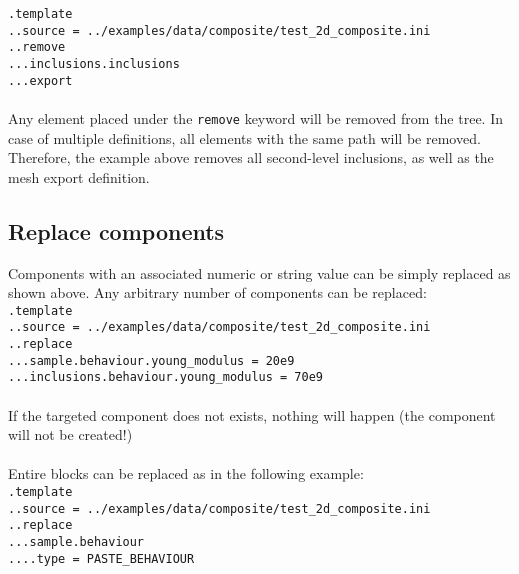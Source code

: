 \documentclass[10pt]{article}
\begin{document}
\noindent \verb+.template+\\
\verb+..source = ../examples/data/composite/test_2d_composite.ini+\\
\verb+..remove+\\
\verb+...inclusions.inclusions+\\
\verb+...export+

\paragraph{} Any element placed under the \verb+remove+ keyword will be removed from the tree. In case of multiple definitions, all elements with the same path will be removed. Therefore, the example above removes all second-level inclusions, as well as the mesh export definition.

\subsection{Replace components}

Components with an associated numeric or string value can be simply replaced as shown above. Any arbitrary number of components can be replaced:\\

\noindent \verb+.template+\\
\verb+..source = ../examples/data/composite/test_2d_composite.ini+\\
\verb+..replace+\\
\verb+...sample.behaviour.young_modulus = 20e9+\\
\verb+...inclusions.behaviour.young_modulus = 70e9+

\paragraph{} If the targeted component does not exists, nothing will happen (the component will not be created!)

\paragraph{} Entire blocks can be replaced as in the following example:\\

\noindent \verb+.template+\\
\verb+..source = ../examples/data/composite/test_2d_composite.ini+\\
\verb+..replace+\\
\verb+...sample.behaviour+\\
\verb+....type = PASTE_BEHAVIOUR+
\end{document}
